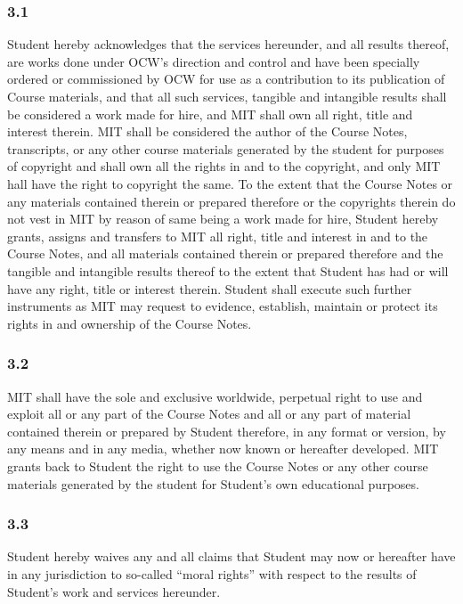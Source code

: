 \documentclass{article}
\begin{document}
\subsubsection*{3.1}
Student hereby acknowledges that the services hereunder, and all results thereof, are works done under OCW’s direction and control and have been specially ordered or commissioned by OCW for use as a contribution to its publication of Course materials, and that all such services, tangible and intangible results shall be considered a work made for hire, and MIT shall own all right, title and interest therein. MIT shall be considered the author of the Course Notes, transcripts, or any other course materials generated by the student for purposes of copyright and shall own all the rights in and to the copyright, and only MIT hall have the right to copyright the same. To the extent that the Course Notes or any materials contained therein or prepared therefore or the copyrights therein do not vest in MIT by reason of same being a work made for hire, Student hereby grants, assigns and transfers to MIT all right, title and interest in and to the Course Notes, and all materials contained therein or prepared therefore and the tangible and intangible results thereof to the extent that Student has had or will have any right, title or interest therein. Student shall execute such further instruments as MIT may request to evidence, establish, maintain or protect its rights in and ownership of the Course Notes.

\subsubsection*{3.2}
MIT shall have the sole and exclusive worldwide, perpetual right to use and exploit all or any part of the Course Notes and all or any part of material contained therein or prepared by Student therefore, in any format or version, by any means and in any media, whether now known or hereafter developed. MIT grants back to Student the right to use the Course Notes or any other course materials generated by the student for Student’s own educational purposes.

\subsubsection*{3.3}
Student hereby waives any and all claims that Student may now or hereafter have in any jurisdiction to so-called “moral rights” with respect to the results of Student’s work and services hereunder.
\end{document}

